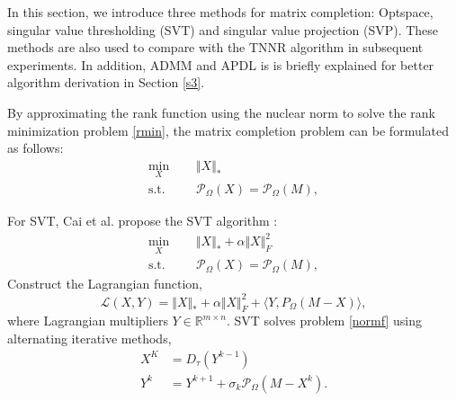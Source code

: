 \documentclass{article}
\begin{document}
{In this section, we introduce three methods for matrix completion: Optspace, singular value thresholding (SVT) and singular value projection (SVP). These methods are also used to compare with the TNNR algorithm in subsequent experiments. In addition, ADMM and APDL is is briefly explained for better algorithm derivation in Section \ref{s3}.

By approximating the rank function using the nuclear norm to solve the rank
minimization problem \eqref{rmin},  the matrix completion problem can be formulated as follows:
\begin{equation}
	\label{normf}
	\begin{aligned}
		\underset{X}{\text{min}} \ \ \ \ &  \ \ \Vert X\Vert_* \\
		\text{s.t.} \ \ \ \ &  \ \  \mathcal{P}_{\Omega}(X) =  \mathcal{P}_{\Omega}(M),
	\end{aligned}
\end{equation}

For SVT, Cai et al. propose the SVT algorithm :
\begin{equation}
	\begin{aligned}
		\underset{X}{\text{min}} \ \ \ \ &  \ \ \Vert X\Vert_* + \alpha\Vert X\Vert_F^2\\
		\text{s.t.} \ \ \ \ &  \ \  \mathcal{P}_{\Omega}(X) =  \mathcal{P}_{\Omega}(M),
	\end{aligned}
\end{equation}
Construct the Lagrangian function,
\begin{equation}
	\mathcal{L}(X,Y) = \Vert X\Vert_* + \alpha\Vert X\Vert_F^2 + \langle Y, P_{\Omega}(M-X) \rangle,
\end{equation}
where Lagrangian multipliers $Y \in \mathbb{R}^{m \times n}$. SVT solves problem \eqref{normf} using alternating iterative methods,
\begin{equation}
	\begin{aligned}
		X^K & = D_\tau(Y^{k-1})\\
		Y^k & = Y^{k+1} + \sigma_k\mathcal{P}_\Omega(M-X^k).
	\end{aligned}
\end{equation}

}
\end{document}
